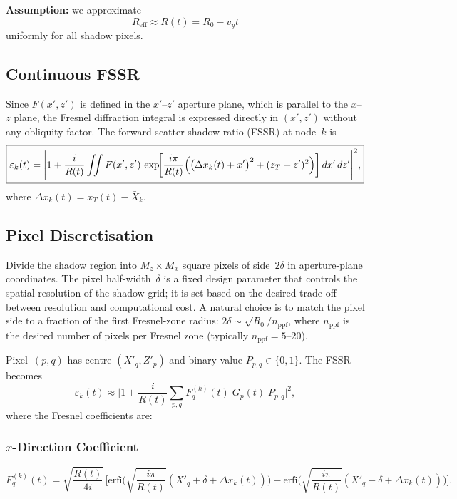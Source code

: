 \documentclass[11pt,a4paper]{article}
\newcommand{\erfi}{\mathrm{erfi}}
\begin{document}
\textbf{Assumption:} we approximate
\begin{equation}
  \boxed{R_{\mathrm{eff}} \approx R(t) = R_0 - v_y t}
  \label{eq:Reff_approx}
\end{equation}
uniformly for all shadow pixels.

\subsection{Continuous FSSR}

Since $F(x',z')$ is defined in the $x'$--$z'$ aperture plane, which
is parallel to the $x$--$z$ plane, the Fresnel diffraction integral
is expressed directly in $(x',z')$ without any obliquity factor.
The forward scatter shadow ratio (FSSR) at node~$k$ is
\begin{equation}
  \boxed{
  \varepsilon_k(t) = \Biggl|1
  + \frac{i}{R(t)}\iint F(x',z')\,
  \exp\!\biggl[\frac{i\pi}{R(t)}\Bigl(
  \bigl(\Delta x_k(t)+x'\bigr)^2
  + (z_T+z')^2\Bigr)\biggr]
  \,dx'\,dz'\Biggr|^2,}
  \label{eq:fssr_continuous}
\end{equation}
where $\Delta x_k(t)=x_T(t)-\bar{X}_k$.

\subsection{Pixel Discretisation}

Divide the shadow region into $M_z\times M_x$ square pixels of
side~$2\delta$ in aperture-plane coordinates.  The pixel
half-width~$\delta$ is a fixed design parameter that controls the
spatial resolution of the shadow grid; it is set based on the
desired trade-off between resolution and computational cost.
A natural choice is to match the pixel side to a fraction of the
first Fresnel-zone radius: $2\delta\sim\sqrt{R_0}/n_{\mathrm{ppf}}$,
where $n_{\mathrm{ppf}}$ is the desired number of pixels per
Fresnel zone (typically $n_{\mathrm{ppf}}=5$--$20$).

Pixel~$(p,q)$ has
centre $(X'_q,Z'_p)$ and binary value $P_{p,q}\in\{0,1\}$.  The
FSSR becomes
\begin{equation}
  \varepsilon_k(t) \approx \biggl|1
  + \frac{i}{R(t)}\sum_{p,q}
  F_q^{(k)}(t)\;G_p(t)\;P_{p,q}\biggr|^2,
  \label{eq:fssr_pixel}
\end{equation}
where the Fresnel coefficients are:

\subsubsection{$x$-Direction Coefficient}
\begin{equation}
  F_q^{(k)}(t)
  = \sqrt{\frac{R(t)}{4i}}\,\biggl[
    \erfi\!\biggl(\sqrt{\frac{i\pi}{R(t)}}
    (X'_q{+}\delta{+}\Delta x_k(t))\biggr)
  - \erfi\!\biggl(\sqrt{\frac{i\pi}{R(t)}}
    (X'_q{-}\delta{+}\Delta x_k(t))\biggr)\biggr].
  \label{eq:Fq}
\end{equation}
\end{document}
